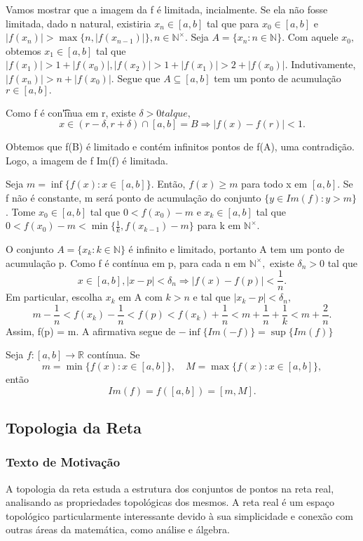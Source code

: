 \documentclass[Analysis/analysis_notes.tex]{subfiles}
\begin{document}
\begin{proof*}
	Vamos mostrar que a imagem da f \'e limitada, incialmente. Se ela n\~ao fosse limitada, dado n natural, existiria $x_{n}\in[a, b]$
	tal que para $x_{0}\in[a, b]$ e $|f(x_{n})| > \max{\{n, |f(x_{n-1})|\}}, n\in \mathbb{N}^{\times}.$ Seja $A=\{x_{n}:n\in \mathbb{N}\}$.
	Com aquele $x_{0},$ obtemos $x_{1}\in[a, b]$ tal que $|f(x_{1})| > 1 + |f(x_{0})|, |f(x_{2})| > 1 + |f(x_{1})| > 2 + |f(x_{0})|.$
	Indutivamente, $|f(x_{n})| > n + |f(x_{0})|.$ Segue que $A\subseteq{[a, b]}$ tem um ponto de acumula\c c\~ao $r\in[a, b].$

	Como f \'e con\t'inua em r, existe $\delta > 0 tal que,$
	$$
		x\in(r-\delta , r+\delta )\cap[a, b] = B \Rightarrow |f(x)-f(r)|<1.
	$$

	Obtemos que f(B) \'e limitado e cont\'em infinitos pontos de f(A), uma contradi\c c\~ao. Logo, a imagem de f Im(f) \'e limitada.

	Seja $m=\inf{\{f(x):x\in[a, b]\}}$. Ent\~ao, $f(x)\geq m$ para todo x em $[a, b].$ Se f n\~ao \'e constante, m ser\'a ponto de
	acumula\c c\~ao do conjunto $\{y\in{Im(f)}: y > m\}$. Tome $x_{0}\in[a, b]$ tal que $0 < f(x_{0}) - m$ e $x_{k}\in[a, b]$
	tal que $0 < f(x_{0}) - m < \min{\{\frac{1}{k}, f(x_{k-1})-m\}}$ para k em $\mathbb{N}^{\times}.$

	O conjunto $A = \{x_{k}: k\in \mathbb{N}\}$ \'e infinito e limitado, portanto A tem um ponto de acumula\c c\~ao p. Como f \'e cont\'inua
	em p, para cada n em $\mathbb{N}^{\times},$ existe $\delta_{n} > 0$ tal que
	$$
		x\in[a, b], |x-p|<\delta_{n} \Rightarrow |f(x)-f(p)|<\frac{1}{n}.
	$$
	Em particular, escolha $x_{k}$ em A com $k>n$ e tal que $|x_{k}-p|<\delta_{n},$
	$$
		m-\frac{1}{n} < f(x_{k})-\frac{1}{n}<f(p)<f(x_{k}) + \frac{1}{n} < m + \frac{1}{n} + \frac{1}{k} < m + \frac{2}{n}.
	$$
	Assim, f(p) = m. A afirmativa segue de $-\inf{\{Im(-f)\}} = \sup\{Im(f)\}$ \qedsymbol
\end{proof*}
\begin{crl*}
	Seja $f:[a, b]\rightarrow \mathbb{R}$ cont\'inua. Se
	$$
		m=\min{\{f(x):x\in[a, b]\}},\quad M = \max{\{f(x):x\in[a, b]\}},
	$$
	ent\~ao
	$$
		Im(f) = f([a, b]) = [m, M].
	$$
\end{crl*}

\subsection{Topologia da Reta}
\subsubsection{Texto de Motiva\c c\~ao}
A topologia da reta estuda a estrutura dos conjuntos de pontos na reta real, analisando as propriedades topológicas dos mesmos. A reta real é um espaço topológico particularmente interessante devido à sua simplicidade e conexão com outras áreas da matemática, como análise e álgebra.
\end{document}
